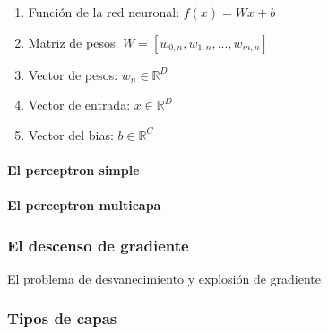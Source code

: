 \begin{enumerate}
    \item Función de la red neuronal: $f(x) = W x + b$
    \item Matriz de pesos: $W = \left[w_{0,n}, w_{1,n}, ...,w_{m,n}\right]$
    \item Vector de pesos: $w_{n} \in \mathbb{R}^{D}$
    \item Vector de entrada: $x \in \mathbb{R}^{D}$
    \item Vector del bias: $b \in \mathbb{R}^{C}$
\end{enumerate}


\paragraph*{El perceptron simple}
\paragraph*{El perceptron multicapa}


\subsubsection{El descenso de gradiente \label{gradient-descent}}


El problema de desvanecimiento y explosión de gradiente





\subsubsection{Tipos de capas}


